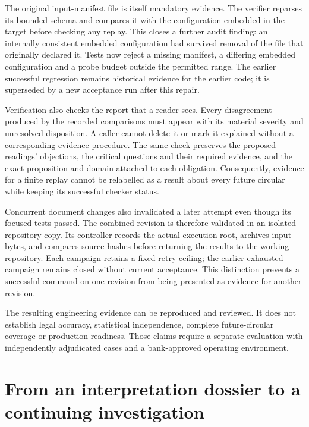 \documentclass[12pt,a4paper,oneside,openany]{book}
\begin{document}
The original input-manifest file is itself mandatory evidence. The verifier
reparses its bounded schema and compares it with the configuration embedded in
the target before checking any replay. This closes a further audit finding: an
internally consistent embedded configuration had survived removal of the file
that originally declared it. Tests now reject a missing manifest, a differing
embedded configuration and a probe budget outside the permitted range. The
earlier successful regression remains historical evidence for the earlier code;
it is superseded by a new acceptance run after this repair.

Verification also checks the report that a reader sees. Every disagreement
produced by the recorded comparisons must appear with its material severity
and unresolved disposition. A caller cannot delete it or mark it explained
without a corresponding evidence procedure. The same check preserves the
proposed readings' objections, the critical questions and their required
evidence, and the exact proposition and domain attached to each obligation.
Consequently, evidence for a finite replay cannot be relabelled as a result
about every future circular while keeping its successful checker status.

Concurrent document changes also invalidated a later attempt even though its
focused tests passed. The combined revision is therefore validated in an
isolated repository copy. Its controller records the actual execution root,
archives input bytes, and compares source hashes before returning the results
to the working repository. Each campaign retains a fixed retry ceiling; the
earlier exhausted campaign remains closed without current acceptance. This
distinction prevents a successful command on one revision from being presented
as evidence for another revision.

The resulting engineering evidence can be
reproduced and reviewed. It does not establish legal accuracy, statistical
independence, complete future-circular coverage or production readiness. Those
claims require a separate evaluation with independently adjudicated cases and a
bank-approved operating environment.

\section{From an interpretation dossier to a continuing investigation}
\label{sec:successor-assurance}
\end{document}
